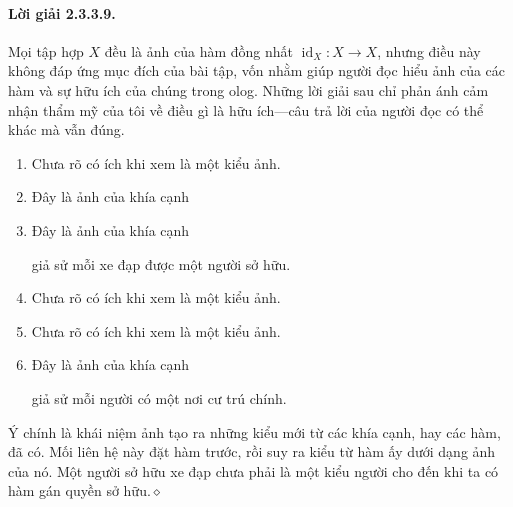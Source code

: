 \paragraph{Lời giải 2.3.3.9.} Mọi tập hợp $X$ đều là ảnh của hàm đồng nhất $\operatorname{id}_X:X\to X$, nhưng điều này không đáp ứng mục đích của bài tập, vốn nhằm giúp người đọc hiểu ảnh của các hàm và sự hữu ích của chúng trong olog. Những lời giải sau chỉ phản ánh cảm nhận thẩm mỹ của tôi về điều gì là hữu ích---câu trả lời của người đọc có thể khác mà vẫn đúng.
\begin{enumerate}[label=\alph*.]
\item Chưa rõ có ích khi xem là một kiểu ảnh.
\item Đây là ảnh của khía cạnh
\begin{center}\end{center}
\item Đây là ảnh của khía cạnh
\begin{center}\end{center}
giả sử mỗi xe đạp được một người sở hữu.
\item Chưa rõ có ích khi xem là một kiểu ảnh.
\item Chưa rõ có ích khi xem là một kiểu ảnh.
\item Đây là ảnh của khía cạnh
\begin{center}\end{center}
giả sử mỗi người có một nơi cư trú chính.
\end{enumerate}
Ý chính là khái niệm ảnh tạo ra những kiểu mới từ các khía cạnh, hay các hàm, đã có. Mối liên hệ này đặt hàm trước, rồi suy ra kiểu từ hàm ấy dưới dạng ảnh của nó. Một người sở hữu xe đạp chưa phải là một kiểu người cho đến khi ta có hàm gán quyền sở hữu.\hfill$\diamond$
